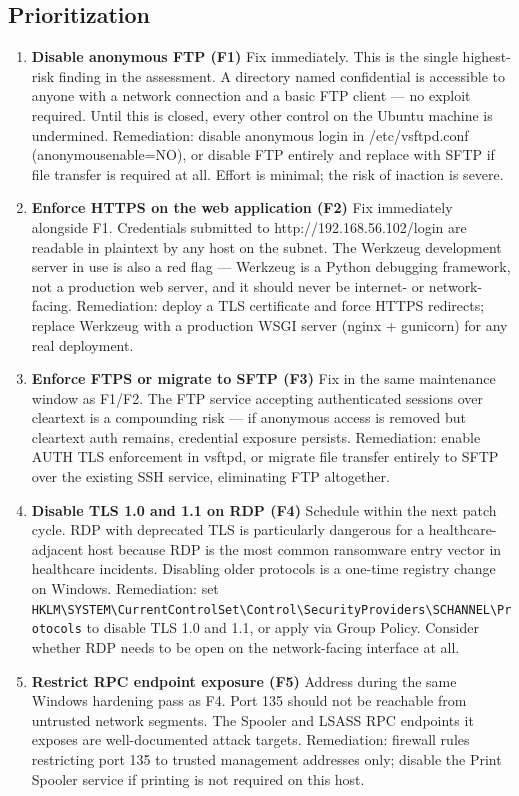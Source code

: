 \documentclass[12pt]{article}
\begin{document}
\subsection{Prioritization}
\begin{enumerate}
	\item \textbf{Disable anonymous FTP (F1)} Fix immediately. This is the single highest-risk finding in the assessment. A directory named confidential is accessible to anyone with a network connection and a basic FTP client — no exploit required. Until this is closed, every other control on the Ubuntu machine is undermined. Remediation: disable anonymous login in /etc/vsftpd.conf (anonymous\underbar{   }enable=NO), or disable FTP entirely and replace with SFTP if file transfer is required at all. Effort is minimal; the risk of inaction is severe.
	\item \textbf{Enforce HTTPS on the web application (F2)} Fix immediately alongside F1. Credentials submitted to http://192.168.56.102/login are readable in plaintext by any host on the subnet. The Werkzeug development server in use is also a red flag — Werkzeug is a Python debugging framework, not a production web server, and it should never be internet- or network-facing. Remediation: deploy a TLS certificate and force HTTPS redirects; replace Werkzeug with a production WSGI server (nginx + gunicorn) for any real deployment.
	\item \textbf{Enforce FTPS or migrate to SFTP (F3)} Fix in the same maintenance window as F1/F2. The FTP service accepting authenticated sessions over cleartext is a compounding risk — if anonymous access is removed but cleartext auth remains, credential exposure persists. Remediation: enable AUTH TLS enforcement in vsftpd, or migrate file transfer entirely to SFTP over the existing SSH service, eliminating FTP altogether.
	\item \textbf{Disable TLS 1.0 and 1.1 on RDP (F4)} Schedule within the next patch cycle. RDP with deprecated TLS is particularly dangerous for a healthcare-adjacent host because RDP is the most common ransomware entry vector in healthcare incidents. Disabling older protocols is a one-time registry change on Windows. Remediation: set \verb|HKLM\SYSTEM\CurrentControlSet\Control\SecurityProviders\SCHANNEL\Protocols| to disable TLS 1.0 and 1.1, or apply via Group Policy. Consider whether RDP needs to be open on the network-facing interface at all.
	\item \textbf{Restrict RPC endpoint exposure (F5)} Address during the same Windows hardening pass as F4. Port 135 should not be reachable from untrusted network segments. The Spooler and LSASS RPC endpoints it exposes are well-documented attack targets. Remediation: firewall rules restricting port 135 to trusted management addresses only; disable the Print Spooler service if printing is not required on this host.

\end{enumerate}
\end{document}
